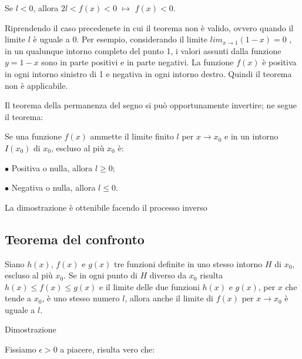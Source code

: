\documentclass[a4paper,11pt]{article}
\begin{document}
Se $l<0$, allora $2l < f(x) <0$ \hspace{1mm} $\mapsto $ \hspace{1mm} $f(x)<0$.
\hspace{1cm}


\vspace{2mm}

Riprendendo il caso precedenete in cui il teorema non è valido, ovvero quando il limite $l$ è uguale a 0. 
Per esempio, considerando il limite $lim_{x \to 1 } (1-x)=0$ , in un qualunque intorno completo del punto 1, i valori assunti dalla funzione $y=1-x$ sono in parte positivi e in parte negativi. La funzione $f(x)$ è positiva in ogni intorno sinistro di 1 e negativa in ogni intorno destro. Quindi il teorema non è applicabile.

Il teorema della permanenza del segno si può opportunamente invertire; ne segue il teorema:

\vspace{1mm}

Se una funzione $f(x)$ ammette il limite finito $l$ per $x \to x_0$ e in un intorno $I(x_0)$ di $x_0$, escluso al più $x_0$ è:

$\bullet$
Positiva o nulla, allora $l \geqslant  0$;

$\bullet$
Negativa o nulla, allora $l \leqslant 0 $.

\vspace{4mm}

La dimostrazione è ottenibile facendo il processo inverso

\subsection{Teorema del confronto}

Siano $h(x)$, $f(x)$ e $g(x)$ tre funzioni definite in uno stesso intorno $H$ di $x_0$, escluso al più $x_0$. Se in ogni punto di $H$ diverso da $x_0$ risulta $h(x) \leqslant f(x) \leqslant g(x)$ e il limite delle due funzioni $h(x)$ e $g(x)$, per $x$ che tende a $x_0$, è uno stesso numero $l$, allora anche il limite di $f(x)$ per $x \to x_0$ è uguale a $l$.

\vspace{2mm}

Dimostrazione

\vspace{1mm}

Fissiamo $\epsilon > 0$ a piacere, risulta vero che:

\vspace{1mm}
\end{document}
